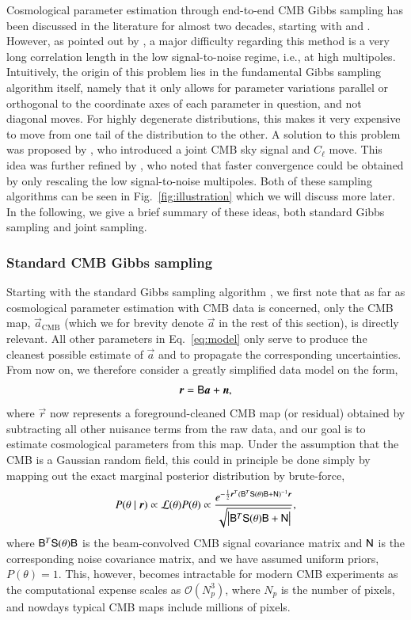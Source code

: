 \documentclass[twocolumn]{../common/aa}
\newcommand{\B}[0]{\tens{B}}
\newcommand{\n}[0]{\vec{n}}
\renewcommand{\a}[0]{\vec{a}}
\newcommand{\N}[0]{\tens{N}}
\renewcommand{\S}[0]{\tens{S}}
\renewcommand{\r}[0]{\vec{r}}
\begin{document}
Cosmological parameter estimation through end-to-end CMB Gibbs sampling has been discussed in the literature for almost two decades, starting with \citet{jewell2004} and \citet{wandelt2004}. However, as pointed out by \citet{eriksen:2004}, a major difficulty regarding this method is a very long correlation length in the low signal-to-noise regime, i.e., at high multipoles. Intuitively, the origin of this problem lies in the fundamental Gibbs sampling algorithm itself, namely that it only allows for parameter variations parallel or orthogonal to the coordinate axes of each parameter in question, and not diagonal moves. For highly degenerate distributions, this makes it very expensive to move from one tail of the distribution to the other. A solution to this problem was proposed by \citet{jewell:2009}, who introduced a joint CMB sky signal and $C_\ell$ move. This idea was further refined by \citet{racine:2016}, who noted that faster convergence could be obtained by only rescaling the low signal-to-noise multipoles. Both of these sampling algorithms can be seen in Fig.~\ref{fig:illustration} which we will discuss more later. In the following, we give a brief summary of these ideas, both standard Gibbs sampling and joint sampling.

\subsubsection{Standard CMB Gibbs sampling}
\label{sec:gibbs}

Starting with the standard Gibbs sampling algorithm \citep{jewell2004,wandelt2004}, we first note that as far as cosmological parameter estimation with CMB data is concerned, only the CMB map, $\a_{\mathrm{CMB}}$ (which we for brevity denote $\a$ in the rest of this section), is directly relevant. All other parameters in Eq.~\eqref{eq:model} only serve to produce the cleanest possible estimate of $\a$ and to propagate the corresponding uncertainties. From now on, we therefore consider a greatly simplified data model on the form,
\begin{equation}
  \r = \B\a + \n,
\end{equation}
where $\r$ now represents a foreground-cleaned CMB map (or residual) obtained by subtracting all other nuisance terms from the raw data, and our goal is to estimate cosmological parameters from this map. Under the assumption that the CMB is a Gaussian random field, this could in principle be done simply by mapping out the exact marginal posterior distribution by brute-force,
\begin{equation}
  P(\theta \mid \r) \propto \mathcal{L}(\theta)P(\theta) \propto \frac{e^{-\frac12 \r^T (\B^T \S(\theta) \B + \N)^{-1}\r}}{\sqrt{\left|\B^T \S(\theta) \B + \N\right|}},
  \label{eq:exact_posterior}
\end{equation}
where $\B^T \S(\theta) \B$ is the beam-convolved CMB signal covariance matrix and $\N$ is the corresponding noise covariance matrix, and we have assumed uniform priors, $P(\theta) = 1$. This, however, becomes intractable for modern CMB experiments as the computational expense scales as $\mathcal{O}(N_p^3)$, where $N_p$ is the number of pixels, and nowdays typical CMB maps include millions of pixels.
\end{document}

